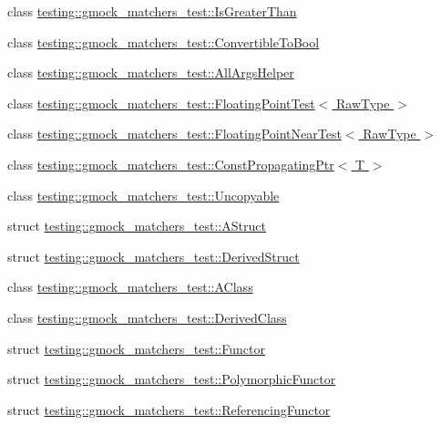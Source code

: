 \begin{DoxyCompactItemize}
\item 
class \hyperlink{classtesting_1_1gmock__matchers__test_1_1_is_greater_than}{testing\+::gmock\+\_\+matchers\+\_\+test\+::\+Is\+Greater\+Than}
\item 
class \hyperlink{classtesting_1_1gmock__matchers__test_1_1_convertible_to_bool}{testing\+::gmock\+\_\+matchers\+\_\+test\+::\+Convertible\+To\+Bool}
\item 
class \hyperlink{classtesting_1_1gmock__matchers__test_1_1_all_args_helper}{testing\+::gmock\+\_\+matchers\+\_\+test\+::\+All\+Args\+Helper}
\item 
class \hyperlink{classtesting_1_1gmock__matchers__test_1_1_floating_point_test}{testing\+::gmock\+\_\+matchers\+\_\+test\+::\+Floating\+Point\+Test$<$ Raw\+Type $>$}
\item 
class \hyperlink{classtesting_1_1gmock__matchers__test_1_1_floating_point_near_test}{testing\+::gmock\+\_\+matchers\+\_\+test\+::\+Floating\+Point\+Near\+Test$<$ Raw\+Type $>$}
\item 
class \hyperlink{classtesting_1_1gmock__matchers__test_1_1_const_propagating_ptr}{testing\+::gmock\+\_\+matchers\+\_\+test\+::\+Const\+Propagating\+Ptr$<$ T $>$}
\item 
class \hyperlink{classtesting_1_1gmock__matchers__test_1_1_uncopyable}{testing\+::gmock\+\_\+matchers\+\_\+test\+::\+Uncopyable}
\item 
struct \hyperlink{structtesting_1_1gmock__matchers__test_1_1_a_struct}{testing\+::gmock\+\_\+matchers\+\_\+test\+::\+A\+Struct}
\item 
struct \hyperlink{structtesting_1_1gmock__matchers__test_1_1_derived_struct}{testing\+::gmock\+\_\+matchers\+\_\+test\+::\+Derived\+Struct}
\item 
class \hyperlink{classtesting_1_1gmock__matchers__test_1_1_a_class}{testing\+::gmock\+\_\+matchers\+\_\+test\+::\+A\+Class}
\item 
class \hyperlink{classtesting_1_1gmock__matchers__test_1_1_derived_class}{testing\+::gmock\+\_\+matchers\+\_\+test\+::\+Derived\+Class}
\item 
struct \hyperlink{structtesting_1_1gmock__matchers__test_1_1_functor}{testing\+::gmock\+\_\+matchers\+\_\+test\+::\+Functor}
\item 
struct \hyperlink{structtesting_1_1gmock__matchers__test_1_1_polymorphic_functor}{testing\+::gmock\+\_\+matchers\+\_\+test\+::\+Polymorphic\+Functor}
\item 
struct \hyperlink{structtesting_1_1gmock__matchers__test_1_1_referencing_functor}{testing\+::gmock\+\_\+matchers\+\_\+test\+::\+Referencing\+Functor}

\end{DoxyCompactItemize}

